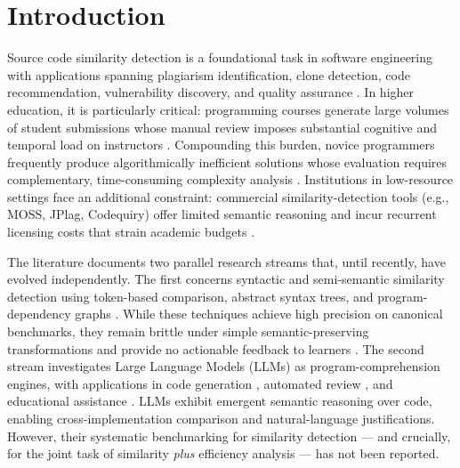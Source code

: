 \documentclass[twocolumn,11pt]{article}
\begin{document}
    \section{Introduction}\label{sec:intro}
    Source code similarity detection is a foundational task in software engineering with applications spanning plagiarism identification, clone detection, code recommendation, vulnerability discovery, and quality assurance \citep{lee2023review,zakeri2023systematic,zhang2025machine}. In higher education, it is particularly critical: programming courses generate large volumes of student submissions whose manual review imposes substantial cognitive and temporal load on instructors \citep{franclinton2020scalable,ebrahim2024semantic}. Compounding this burden, novice programmers frequently produce algorithmically inefficient solutions whose evaluation requires complementary, time-consuming complexity analysis \citep{malik2022enhancing,keuning2017code}. Institutions in low-resource settings face an additional constraint: commercial similarity-detection tools (e.g., MOSS, JPlag, Codequiry) offer limited semantic reasoning and incur recurrent licensing costs that strain academic budgets \citep{vera2025impacto,guerrero2020impact}.
     
    The literature documents two parallel research streams that, until recently, have evolved independently. The first concerns syntactic and semi-semantic similarity detection using token-based comparison, abstract syntax trees, and program-dependency graphs \citep{li2024code,yin2023automatic,zakeri2023systematic}. While these techniques achieve high precision on canonical benchmarks, they remain brittle under simple semantic-preserving transformations and provide no actionable feedback to learners \citep{lee2023review,ebrahim2024semantic}. The second stream investigates Large Language Models (LLMs) as program-comprehension engines, with applications in code generation \citep{jiang2024survey,kazemitabaar2023novices}, automated review \citep{yin2023automatic}, and educational assistance \citep{jost2024impact,manorat2025artificial,lepp2025does}. LLMs exhibit emergent semantic reasoning over code, enabling cross-implementation comparison and natural-language justifications. However, their systematic benchmarking for similarity detection --- and crucially, for the joint task of similarity \emph{plus} efficiency analysis --- has not been reported.
     
\end{document}
